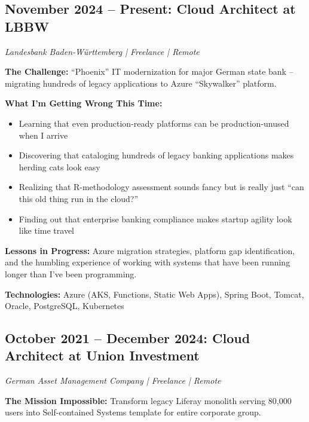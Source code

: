 \documentclass[11pt,a4paper]{article}
\begin{document}
\subsection{November 2024 -- Present: Cloud Architect at LBBW}
\textit{Landesbank Baden-Württemberg | Freelance | Remote}

\textbf{The Challenge:} ``Phoenix'' IT modernization for major German state bank -- migrating hundreds of legacy applications to Azure ``Skywalker'' platform.

\textbf{What I'm Getting Wrong This Time:}
\begin{itemize}[leftmargin=15pt, topsep=0pt, itemsep=2pt]
\item Learning that even production-ready platforms can be production-unused when I arrive
\item Discovering that cataloging hundreds of legacy banking applications makes herding cats look easy
\item Realizing that R-methodology assessment sounds fancy but is really just ``can this old thing run in the cloud?''
\item Finding out that enterprise banking compliance makes startup agility look like time travel
\end{itemize}

\textbf{Lessons in Progress:} Azure migration strategies, platform gap identification, and the humbling experience of working with systems that have been running longer than I've been programming.

\textbf{Technologies:} Azure (AKS, Functions, Static Web Apps), Spring Boot, Tomcat, Oracle, PostgreSQL, Kubernetes

\vspace{6pt}

\subsection{October 2021 -- December 2024: Cloud Architect at Union Investment}
\textit{German Asset Management Company | Freelance | Remote}

\textbf{The Mission Impossible:} Transform legacy Liferay monolith serving 80,000 users into Self-contained Systems template for entire corporate group.
\end{document}
